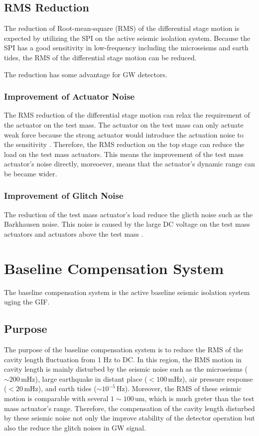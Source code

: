 \subsection{RMS Reduction}
The reduction of Root-mean-square (RMS) of the differential stage motion is expected by utilizing the SPI on the active seismic isolation system. Because the SPI has a good sensitivity in low-frequency including the microseisms and earth tides, the RMS of the differential stage motion can be reduced.

The reduction has some advantage for GW detectors.

\subsubsection{Improvement of Actuator Noise}
The RMS reduction of the differential stage motion can relax the requirement of the actuator on the test mass. The actuator on the test mass can only actuate weak force because the strong actuator would introduce the actuation noise to the sensitivity \cite{michimura2017mirror}. Therefore, the RMS reduction on the top stage can reduce the load on the test mass actuators. This means the improvement of the test mass actuator's noise directly, moreoever, means that the actuator's dynamic range can be became wider.

\subsubsection{Improvement of Glitch Noise}
The reduction of the test mass actuator's load reduce the glicth noise such as the Barkhausen noise. This noise is caused by the large DC voltage on the test mass actuators and actuators above the test mass \cite{aasi2015characterization}.




\section{Baseline Compensation System}\label{sec:54}
The baseline compensation system is the active baseline seismic isolation system uging the GIF. 

\subsection{Purpose}
The purpose of the baseline compensation system is to reduce the RMS of the cavity length fluctuation from 1 Hz to DC. In this region, the RMS motion in cavity length is mainly disturbed by the seismic noise such as the microseisms ($\sim 200\,\mathrm{mHz}$), large earthquake in distant place ($< 100\,\mathrm{mHz}$), air pressure response ($< 20\, \mathrm{mHz}$), and earth tides ($\sim 10^{-5}\,\mathrm{Hz}$). Moreover, the RMS of these seismic motion is comparable with several $1\sim100\,\mathrm{um}$, which is much greter than the test mass actuator's range. Therefore, the compensation of the cavity length disturbed by these seismic noise not only the improve stability of the detector operation but also the reduce the glitch noises in GW signal.

